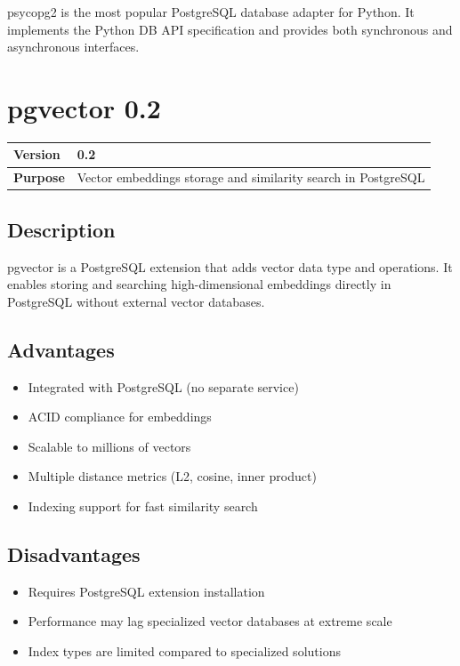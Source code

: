 \documentclass[12pt,a4paper]{report}
\begin{document}
psycopg2 is the most popular PostgreSQL database adapter for Python. It implements the Python DB API specification and provides both synchronous and asynchronous interfaces.

\section{pgvector 0.2}

\begin{tabular}{|p{4cm}|p{10cm}|}
\hline
\textbf{Version} & 0.2 \\
\hline
\textbf{Purpose} & Vector embeddings storage and similarity search in PostgreSQL \\
\hline
\end{tabular}

\subsection{Description}

pgvector is a PostgreSQL extension that adds vector data type and operations. It enables storing and searching high-dimensional embeddings directly in PostgreSQL without external vector databases.

\subsection{Advantages}

\begin{itemize}
    \item Integrated with PostgreSQL (no separate service)
    \item ACID compliance for embeddings
    \item Scalable to millions of vectors
    \item Multiple distance metrics (L2, cosine, inner product)
    \item Indexing support for fast similarity search
\end{itemize}

\subsection{Disadvantages}

\begin{itemize}
    \item Requires PostgreSQL extension installation
    \item Performance may lag specialized vector databases at extreme scale
    \item Index types are limited compared to specialized solutions
\end{itemize}
\end{document}
